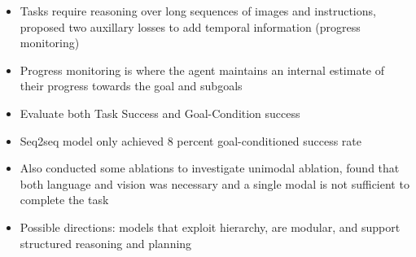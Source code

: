 \begin{itemize}
  \item Tasks require reasoning over long sequences of images and instructions, proposed two auxillary losses to add temporal information (progress monitoring)
  \item Progress monitoring is where the agent maintains an internal estimate of their progress towards the goal and subgoals
  \item Evaluate both Task Success and Goal-Condition success
  \item Seq2seq model only achieved 8 percent goal-conditioned success rate
  \item Also conducted some ablations to investigate unimodal ablation, found that both language and vision was necessary and a single modal is not sufficient to complete the task
  \item Possible directions: models that exploit hierarchy, are modular, and support structured reasoning and planning
\end{itemize}